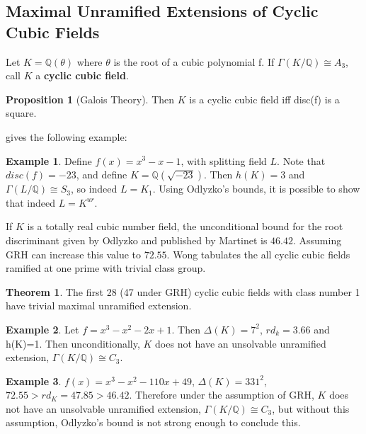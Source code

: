 \documentclass[12pt]{extarticle}
\newcommand{\Q}{\mathbb{Q}}
\newcommand{\<}{\langle}
\renewcommand{\>}{\rangle}
\theoremstyle{definition}
\newtheorem{theorem}{Theorem}
\newtheorem{proposition}{Proposition}
\newtheorem*{example}{Example}
\begin{document}
\subsection{Maximal Unramified Extensions of Cyclic Cubic Fields}
Let $K=\Q(\theta)$ where $\theta$ is the root of a cubic polynomial 
f. If $\Gamma(K/\Q) \cong A_3$, call $K$ a  \textbf{cyclic cubic field}.
\begin{proposition}[Galois Theory]
Then $K$ is a cyclic cubic field iff disc(f) is a square. 

\cite{SERR} gives the following example:
\begin{example}
Define $f(x) = x^3-x-1$, with splitting field $L$. Note that $disc(f)=-23$, and define $K=\Q(\sqrt{-23})$. Then $h(K)=3$ and $\Gamma(L/\Q) \cong S_3$, so indeed $L=K_1$. Using Odlyzko's bounds, it is possible to show that indeed $L = K^{ur}$.
\end{example}

\end{proposition} If $K$ is a totally real cubic number field, the unconditional bound for the root discriminant given by Odlyzko and published by Martinet is $46.42$. Assuming GRH can increase this value to $72.55$. Wong tabulates the all cyclic cubic fields ramified at one prime with trivial class group. 
\begin{theorem}
The first 28 (47 under GRH) cyclic cubic fields with class number 1 have trivial maximal unramified extension.
\end{theorem}
\begin{example}
    Let $f=x^3-x^2-2x+1$. Then $\Delta(K)=7^2$, $rd_{k}=3.66$ and h(K)=1. Then unconditionally, $K$ does not have an unsolvable unramified extension, $\Gamma(K/\Q)\cong C_3$.
\end{example}
\begin{example}
    $f(x)=x^3 -x^2 -110x +49$, $\Delta(K)=331^2$, $72.55 > rd_{K}=47.85 > 46.42$. Therefore under the assumption of GRH, $K$ does not have an unsolvable unramified extension, $\Gamma(K/\Q)\cong C_3$, but without this assumption, Odlyzko's bound is not strong enough to conclude this.
\end{example}
\end{document}
